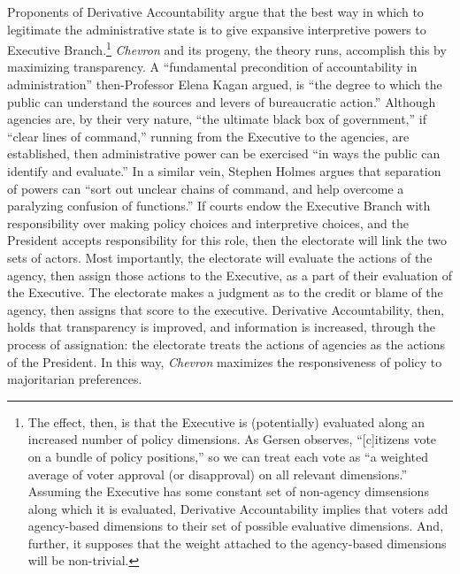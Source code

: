 \documentclass{article}
\begin{document}
Proponents of Derivative Accountability argue that the best way in which to legitimate the administrative state is to give expansive interpretive powers to Executive Branch.\footnote{The effect, then, is that the Executive is (potentially) evaluated along an increased number of policy dimensions. As Gersen observes, ``[c]itizens vote on a bundle of policy positions,'' so we can treat each vote as ``a weighted average of voter approval (or disapproval) on all relevant dimensions.'' \citep[p. 313]{Gersen2010b} Assuming the Executive has some constant set of non-agency dimsensions along which it is evaluated, Derivative Accountability implies that voters add agency-based dimensions to their set of possible evaluative dimensions. And, further, it supposes that the weight attached to the agency-based dimensions will be non-trivial.} \emph{Chevron} and its progeny, the theory runs, accomplish this by maximizing transparency. A ``fundamental precondition of accountability in administration'' then-Professor Elena Kagan argued, is ``the degree to which the public can understand the sources and levers of bureaucratic action.'' \citep[p. 2332]{Kagan2001b} Although agencies are, by their very nature, ``the ultimate black box of government,'' if ``clear lines of command,'' running from the Executive to the agencies, are established, then administrative power can be exercised ``in ways the public can identify and evaluate.'' \citep[p. 2332]{Kagan2001b} In a similar vein, Stephen Holmes argues that separation of powers can ``sort out unclear chains of command, and help overcome a paralyzing confusion of functions.''\citep[p. 165]{Holmes1995} If courts endow the Executive Branch with responsibility over making policy choices and interpretive choices, and the President accepts responsibility for this role, then the electorate will link the two sets of actors. Most importantly, the electorate will evaluate the actions of the agency, then assign those actions to the Executive, as a part of their evaluation of the Executive. The electorate makes a judgment as to the credit or blame of the agency, then assigns that score to the executive. Derivative Accountability, then, holds that transparency is improved, and information is increased, through the process of assignation: the electorate treats the actions of agencies as the actions of the President. In this way, \emph{Chevron} maximizes the responsiveness of policy to majoritarian preferences.
\end{document}
